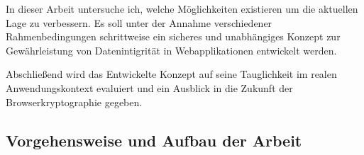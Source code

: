 In dieser Arbeit untersuche ich, welche Möglichkeiten existieren um die aktuellen Lage zu verbessern. Es soll unter der Annahme verschiedener Rahmenbedingungen schrittweise ein sicheres und unabhängiges Konzept zur Gewährleistung von Datenintigrität in Webapplikationen entwickelt werden.

Abschließend wird das Entwickelte Konzept auf seine Tauglichkeit im realen Anwendungskontext evaluiert und ein Ausblick in die Zukunft der Browserkryptographie gegeben.



\subsection{Vorgehensweise und Aufbau der Arbeit}
\tbd

